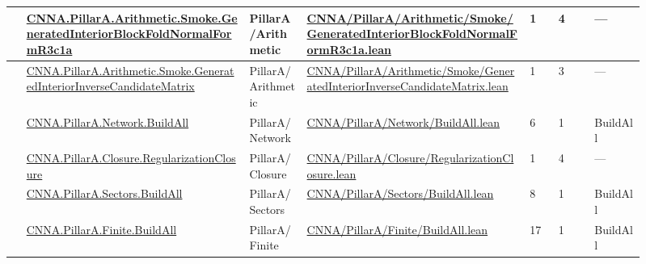 \begin{longtable}{L{0.025\linewidth} L{0.315\linewidth} L{0.08\linewidth} L{0.315\linewidth} L{0.045\linewidth} L{0.055\linewidth} L{0.07\linewidth}}
\hline
{} & \href{run:repo_snapshot/CNNA/PillarA/Arithmetic/Smoke/GeneratedInteriorBlockFoldNormalFormR3c1a.lean}{CNNA.\allowbreak{}PillarA.\allowbreak{}Arithmetic.\allowbreak{}Smoke.\allowbreak{}GeneratedInteriorBlockFoldNormalFormR3c1a} & PillarA/\allowbreak{}Arithmetic & \href{run:repo_snapshot/CNNA/PillarA/Arithmetic/Smoke/GeneratedInteriorBlockFoldNormalFormR3c1a.lean}{CNNA/\allowbreak{}PillarA/\allowbreak{}Arithmetic/\allowbreak{}Smoke/\allowbreak{}GeneratedInteriorBlockFoldNormalFormR3c1a.\allowbreak{}lean} & 1 & 4 & ---\\
\hline
{} & \href{run:repo_snapshot/CNNA/PillarA/Arithmetic/Smoke/GeneratedInteriorInverseCandidateMatrix.lean}{CNNA.\allowbreak{}PillarA.\allowbreak{}Arithmetic.\allowbreak{}Smoke.\allowbreak{}GeneratedInteriorInverseCandidateMatrix} & PillarA/\allowbreak{}Arithmetic & \href{run:repo_snapshot/CNNA/PillarA/Arithmetic/Smoke/GeneratedInteriorInverseCandidateMatrix.lean}{CNNA/\allowbreak{}PillarA/\allowbreak{}Arithmetic/\allowbreak{}Smoke/\allowbreak{}GeneratedInteriorInverseCandidateMatrix.\allowbreak{}lean} & 1 & 3 & ---\\
\hline
{} & \href{run:repo_snapshot/CNNA/PillarA/Network/BuildAll.lean}{CNNA.\allowbreak{}PillarA.\allowbreak{}Network.\allowbreak{}BuildAll} & PillarA/\allowbreak{}Network & \href{run:repo_snapshot/CNNA/PillarA/Network/BuildAll.lean}{CNNA/\allowbreak{}PillarA/\allowbreak{}Network/\allowbreak{}BuildAll.\allowbreak{}lean} & 6 & 1 & BuildAll\\
\hline
{} & \href{run:repo_snapshot/CNNA/PillarA/Closure/RegularizationClosure.lean}{CNNA.\allowbreak{}PillarA.\allowbreak{}Closure.\allowbreak{}RegularizationClosure} & PillarA/\allowbreak{}Closure & \href{run:repo_snapshot/CNNA/PillarA/Closure/RegularizationClosure.lean}{CNNA/\allowbreak{}PillarA/\allowbreak{}Closure/\allowbreak{}RegularizationClosure.\allowbreak{}lean} & 1 & 4 & ---\\
\hline
{} & \href{run:repo_snapshot/CNNA/PillarA/Sectors/BuildAll.lean}{CNNA.\allowbreak{}PillarA.\allowbreak{}Sectors.\allowbreak{}BuildAll} & PillarA/\allowbreak{}Sectors & \href{run:repo_snapshot/CNNA/PillarA/Sectors/BuildAll.lean}{CNNA/\allowbreak{}PillarA/\allowbreak{}Sectors/\allowbreak{}BuildAll.\allowbreak{}lean} & 8 & 1 & BuildAll\\
\hline
{} & \href{run:repo_snapshot/CNNA/PillarA/Finite/BuildAll.lean}{CNNA.\allowbreak{}PillarA.\allowbreak{}Finite.\allowbreak{}BuildAll} & PillarA/\allowbreak{}Finite & \href{run:repo_snapshot/CNNA/PillarA/Finite/BuildAll.lean}{CNNA/\allowbreak{}PillarA/\allowbreak{}Finite/\allowbreak{}BuildAll.\allowbreak{}lean} & 17 & 1 & BuildAll\\

\end{longtable}
